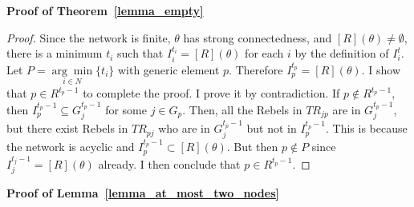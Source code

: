 \documentclass[12pt,letter]{article}
\newtheorem*{lemma*}{Lemma}
\newtheorem{definition}{Definition}[section]
\theoremstyle{definition}
\theoremstyle{remark}
\theoremstyle{claim}
\begin{document}
%
\bigskip
\noindent\textbf{Proof of Theorem~\ref{lemma_empty}}
\begin{proof}



Since the network is finite, $\theta$ has strong connectedness, and $[R](\theta)\neq \emptyset$, there is a minimum $t_i$ such that $I^{t_i}_i=[R](\theta)$ for each $i$ by the definition of $I^t_i$. Let $P=\underset{i\in N}{\arg\min}\{t_i\}$ with generic element $p$. Therefore $I^{t_p}_p=[R](\theta)$. I show that $p\in R^{t_p-1}$ to complete the proof. I prove it by contradiction. If $p\notin R^{t_p-1}$, then $I^{t_p-1}_p\subseteq G^{t_p-1}_j$ for some $j\in G_p$. Then, all the Rebels in $TR_{jp}$ are in $G^{t_p-1}_j$, but there exist Rebels in $TR_{pj}$ who are in $G^{t_p-1}_j$ but not in $I^{t_p-1}_p$. This is because the network is acyclic and $I^{t_p-1}_p\subset [R](\theta)$. But then $p\notin P$ since $I^{t_j-1}_j=[R](\theta)$ already. I then conclude that $p\in R^{t_p-1}$.

\end{proof}





\noindent\textbf{Proof of Lemma~\ref{lemma_at_most_two_nodes}} 
   
\end{document}

